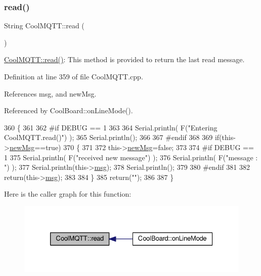 \subsubsection{\texorpdfstring{read()}{read()}}
{\footnotesize\ttfamily String Cool\+M\+Q\+T\+T\+::read (\begin{DoxyParamCaption}{ }\end{DoxyParamCaption})}

\hyperlink{classCoolMQTT_ae3c18f6ae9723746d32765f1c8f176ca}{Cool\+M\+Q\+T\+T\+::read()}\+: This method is provided to return the last read message. 

Definition at line 359 of file Cool\+M\+Q\+T\+T.\+cpp.



References msg, and new\+Msg.



Referenced by Cool\+Board\+::on\+Line\+Mode().


\begin{DoxyCode}
360 \{   
361 
362 \textcolor{preprocessor}{#if DEBUG == 1 }
363 
364     Serial.println( F(\textcolor{stringliteral}{"Entering CoolMQTT.read()"}) );
365     Serial.println();
366 
367 \textcolor{preprocessor}{#endif }
368 
369     \textcolor{keywordflow}{if}(this->\hyperlink{classCoolMQTT_a3240388137b885775aadf38e96b24c6b}{newMsg}==\textcolor{keyword}{true})
370     \{
371         
372         this->\hyperlink{classCoolMQTT_a3240388137b885775aadf38e96b24c6b}{newMsg}=\textcolor{keyword}{false};
373 
374 \textcolor{preprocessor}{#if DEBUG == 1 }
375         Serial.println( F(\textcolor{stringliteral}{"received new message"}) );
376         Serial.println( F(\textcolor{stringliteral}{"message : "}) );
377         Serial.println(this->\hyperlink{classCoolMQTT_af6b19e7074dbbb4ae493c44dcb53f7ff}{msg});
378         Serial.println();
379 
380 \textcolor{preprocessor}{#endif}
381 
382         \textcolor{keywordflow}{return}(this->\hyperlink{classCoolMQTT_af6b19e7074dbbb4ae493c44dcb53f7ff}{msg});
383         
384     \}
385     \textcolor{keywordflow}{return}(\textcolor{stringliteral}{""});
386 
387 \}
\end{DoxyCode}
Here is the caller graph for this function\+:\nopagebreak
\begin{figure}[H]
\begin{center}
\leavevmode
\includegraphics[width=326pt]{classCoolMQTT_ae3c18f6ae9723746d32765f1c8f176ca_icgraph}
\end{center}
\end{figure}
\mbox{\label{classCoolMQTT_a5d003307eff78efbd585e42b43b72b6d}} 
